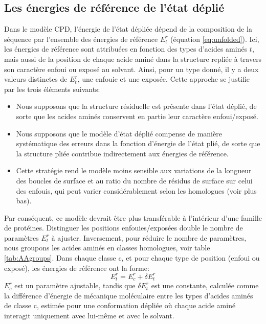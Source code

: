 \subsection{Les énergies de référence de l'état déplié}

Dans le modèle CPD, l'énergie de l'état dépliée dépend de la composition de la séquence par l'ensemble des énergies de référence $E^r_t$ (équation \ref{eq:unfolded}). Ici, les énergies de référence sont attribuées en fonction des types d'acides aminés $t$, mais aussi de la position de chaque acide aminé dans la structure repliée à travers son caractère enfoui ou exposé au solvant. Ainsi, pour un type donné, il y a deux valeurs distinctes de $E^r_t$, une enfouie et une exposée. Cette approche se justifie par les trois éléments suivants:

\begin{itemize}
\item Nous supposons que la structure résiduelle est présente dans l'état déplié, de sorte que les acides aminés conservent en partie leur caractère enfoui/exposé.
\item Nous supposons que le modèle d'état déplié compense de manière systématique des erreurs dans la fonction d'énergie de l'état plié, de sorte que  la structure pliée contribue indirectement aux énergies de référence.
\item Cette stratégie rend le modèle moins sensible aux variations de la longueur des boucles de surface et au ratio  du nombre de résidus de surface sur  celui des enfouis, qui peut varier considérablement selon les homologues (voir plus bas).  
\end{itemize}
Par conséquent, ce modèle devrait être plus transférable à l'intérieur d'une famille de protéines. Distinguer les positions enfouies/exposées double le nombre de paramètres $E^r_t$ à ajuster. Inversement, pour réduire le nombre de paramètres, nous groupons les acides aminés en classes homologues, voir table \ref{tab:AAgroups}. Dans chaque classe c, et pour chaque type de position (enfoui ou exposé), les énergies de référence ont la forme:
\begin{equation}
E^r_t = E^r_c + \delta E^r_t
\end{equation}
$E^r_c$ est un paramètre ajustable, tandis que $\delta E^r_t$ est une constante, calculée comme la différence d'énergie de mécanique moléculaire entre les types d'acides aminés de classe c, estimée pour une conformation dépliée où chaque acide aminé interagit uniquement avec lui-même et avec le solvant.

